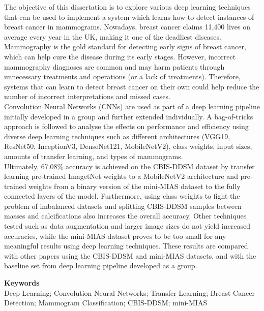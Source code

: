 

The objective of this dissertation is to explore various deep learning techniques that can be used to implement a system which learns how to detect instances of breast cancer in mammograms. Nowadays, breast cancer claims 11,400 lives on average every year in the UK, making it one of the deadliest diseases. Mammography is the gold standard for detecting early signs of breast cancer, which can help cure the disease during its early stages. However, incorrect mammography diagnoses are common and may harm patients through unnecessary treatments and operations (or a lack of treatments). Therefore, systems that can learn to detect breast cancer on their own could help reduce the number of incorrect interpretations and missed cases.\\

Convolution Neural Networks (CNNs) are used as part of a deep learning pipeline initially developed in a group and further extended individually. A bag-of-tricks approach is followed to analyse the effects on performance and efficiency using diverse deep learning techniques such as different architectures (VGG19, ResNet50, InceptionV3, DenseNet121, MobileNetV2), class weights, input sizes, amounts of transfer learning, and types of mammograms.\\

Ultimately, 67.08\% accuracy is achieved on the CBIS-DDSM dataset by transfer learning pre-trained ImagetNet weights to a MobileNetV2 architecture and pre-trained weights from a binary version of the mini-MIAS dataset to the fully connected layers of the model. Furthermore, using class weights to fight the problem of imbalanced datasets and splitting CBIS-DDSM samples between masses and calcifications also increases the overall accuracy. Other techniques tested such as data  augmentation and larger image sizes do not  yield increased accuracies, while the mini-MIAS dataset proves to be too small for any meaningful results using deep learning techniques. These results are compared with other papers using the CBIS-DDSM and mini-MIAS datasets, and with the baseline set from deep learning pipeline developed as a group.\\

\vspace{12mm}
\begin{center}

\textbf{Keywords}\\
\vspace{5mm}
Deep Learning; Convolution Neural Networks; Transfer Learning; Breast Cancer Detection; Mammogram Classification; CBIS-DDSM; mini-MIAS

\end{center}

